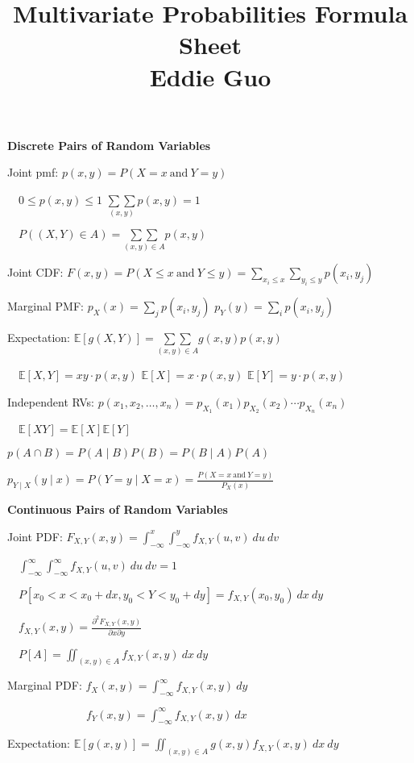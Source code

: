 \documentclass[twocolumn]{article}
\title{
	\vspace{-2em}
	\normalsize \textbf{Multivariate Probabilities Formula Sheet} \\
	\small Eddie Guo \\
	\dotfill
	\vspace{-5em}
}
\date{}
\begin{document}
\maketitle

\small

\textbf{Discrete Pairs of Random Variables}

Joint pmf: $p(x, y) = P(X=x\ \text{and}\ Y=y)$

$\quad 0 \leq p(x, y) \leq 1$ \hfill $\underset{(x,y)}{\sum\sum} p(x,y) = 1$

$\quad P((X, Y) \in A) = \underset{(x,y) \in A}{\sum\sum} p(x, y)$

Joint CDF: $F(x, y) = P(X \leq x\ \text{and}\ Y \leq y) = \sum_{x_i \leq x} \sum_{y_i \leq y} p(x_i, y_j)$

Marginal PMF: $p_X(x) = \sum_j p(x_i, y_j)$ \hfill $p_Y(y) = \sum_i p(x_i, y_j)$

Expectation: $\mathbb E[g(X, Y)] = \underset{(x,y) \in A}{\sum\sum} g(x,y) p(x, y)$

$\quad \mathbb E[X, Y] = xy \cdot p(x, y)$ \hfill $\mathbb E[X] = x \cdot p(x, y)$  \hfill $\mathbb E[Y] = y \cdot p(x, y)$

Independent RVs: $p(x_1, x_2, \dots, x_n) = p_{X_1}(x_1) p_{X_2}(x_2) \cdots p_{X_n}(x_n)$

$\quad \mathbb E[XY] = \mathbb E[X] \mathbb E[Y]$

$p(A \cap B) = P(A \mid B) P(B) = P(B \mid A) P(A)$

$p_{Y \mid X} (y \mid x) = P(Y=y \mid X = x) = \frac{P(X=x\ \text{and}\ Y=y)}{P_X(x)}$

\newpage

\textbf{Continuous Pairs of Random Variables}

Joint PDF: $F_{X,Y}(x, y) = \int_{-\infty}^x \int_{-\infty}^y f_{X,Y}(u, v)\ du\ dv$

$\quad \int_{-\infty}^\infty \int_{-\infty}^\infty f_{X,Y}(u,v)\ du\ dv = 1$

$\quad P[x_0 < x < x_0 + dx, y_0 < Y < y_0 + dy] = f_{X,Y}(x_0, y_0)\ dx\ dy$

$\quad f_{X, Y}(x,y) = \frac{\partial^2 F_{X,Y}(x,y)}{\partial x \partial y}$

$\quad P[A] = \iint_{(x,y) \in A} f_{X,Y}(x,y)\ dx\ dy$

Marginal PDF: $f_X(x,y) = \int_{-\infty}^\infty f_{X,Y}(x, y)\ dy$

$\hspace{7em} f_Y(x,y) = \int_{-\infty}^\infty f_{X,Y}(x, y)\ dx$

Expectation: $\mathbb E[g(x,y)] = \iint_{(x,y) \in A} g(x,y) f_{X,Y}(x,y)\ dx\ dy$
\end{document}
